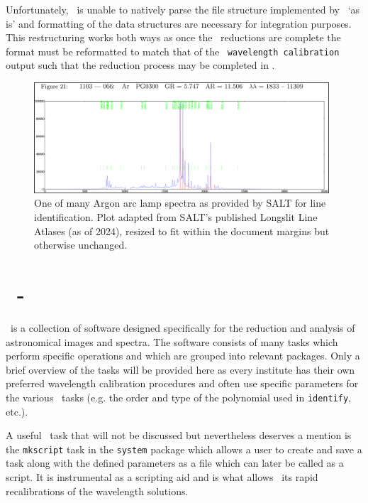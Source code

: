 Unfortunately, \iraf\ is unable to natively parse the file structure implemented by \polsalt\ `as is' and formatting of the data structures are necessary for integration purposes. This restructuring works both ways as once the \iraf\ reductions are complete the format must be reformatted to match that of the \polsalt\ \texttt{wavelength calibration} output such that the reduction process may be completed in \polsalt.

\begin{figure}[t]
    \centering
    \includegraphics[width = 0.98\textwidth]{figures/3_arc_spectrum.png}
    \caption{One of many Argon arc lamp spectra as provided by \gls{SALT} for line identification. Plot adapted from \gls{SALT}'s published Longslit Line Atlases (as of 2024), resized to fit within the document margins but otherwise unchanged.\protect\footnotemark}
    \label{fig:ar_arc_salt}
\end{figure}

\section[\iraf]{\iraf\ - } \label{sec:iraf}

\iraf\ is a collection of software designed specifically for the reduction and analysis of astronomical images and spectra. The software consists of many tasks which perform specific operations and which are grouped into relevant packages. Only a brief overview of the tasks will be provided here as every institute has their own preferred wavelength calibration procedures and often use specific parameters for the various \iraf\ tasks (e.g. the order and type of the polynomial used in \texttt{identify}, etc.).

A useful \iraf\ task that will not be discussed but nevertheless deserves a mention is the \texttt{mkscript} task in the \texttt{system} package which allows a user to create and save a task along with the defined parameters as a file which can later be called as a script. It is instrumental as a scripting aid and is what allows \iraf\ its rapid recalibrations of the wavelength solutions.

